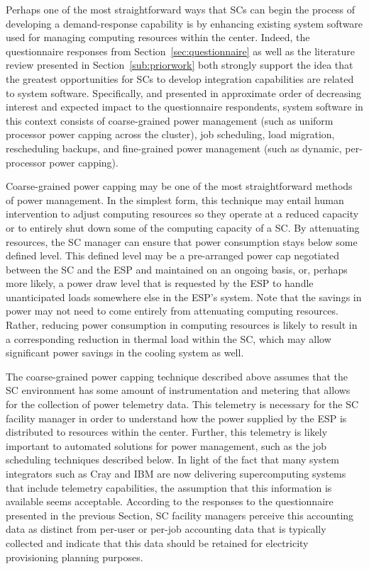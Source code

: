 Perhaps one of the most straightforward ways that SCs can begin the process of developing a demand-response
capability is by enhancing existing system software used for managing
computing resources within the center. Indeed, the questionnaire
responses from Section~\ref{sec:questionnaire} as well as the literature
review presented in Section~\ref{sub:priorwork} both strongly support the
idea that the greatest opportunities for SCs to
develop integration capabilities are related to system software.
Specifically, and presented in approximate order of decreasing
interest and expected impact to the questionnaire respondents, system
software in this context consists of coarse-grained power management
(such as uniform processor power capping across the cluster), job scheduling, load migration, rescheduling backups, and fine-grained 
power management (such as dynamic, per-processor power capping).

Coarse-grained power capping may be one of the most straightforward
methods of power management. In the simplest form, this technique may
entail human intervention to adjust computing resources so they
operate at a reduced capacity or to entirely shut down some of the
computing capacity of a SC. By attenuating
resources, the SC manager can ensure that power
consumption stays below some defined level. This defined level may be
a pre-arranged power cap negotiated between the SC
and the ESP and maintained on an ongoing basis,
or, perhaps more likely, a power draw level that is requested by the
ESP to handle unanticipated loads somewhere else
in the ESP's system. 
Note that the savings
in power may not need to come entirely from attenuating computing
resources. Rather, reducing power consumption in computing resources
is likely to result in a corresponding reduction in thermal load
within the SC, which
may allow significant power savings in the cooling system as well.

The coarse-grained power capping technique described above assumes
that the SC environment has some amount of
instrumentation and metering that allows for the collection of power
telemetry data. This telemetry is necessary for the SC facility manager in order to understand how the power supplied
by the ESP is distributed to resources within the
center. Further, this telemetry is likely important to automated
solutions for power management, such as the job scheduling techniques
described below. In light of the fact that many system integrators
such as Cray and IBM are now delivering supercomputing systems that
include telemetry capabilities, the assumption that this information
is available seems acceptable. According to the responses to the
questionnaire presented in the previous Section, SC
facility managers perceive this accounting data as distinct from
per-user or per-job accounting data that is typically collected and
indicate that this data should be retained for electricity
provisioning planning purposes.

